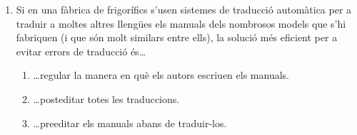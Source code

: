\begin{enumerate}
\item   Si en una fàbrica de frigorífics s'usen sistemes de traducció
  automàtica per a traduir a moltes altres llengües els manuals dels
  nombrosos models que s'hi fabriquen (i que són molt similars entre
  ells), la solució més eficient per a evitar errors de traducció
  és{\ldots}
  \begin{enumerate}
  \item \ldots regular la manera en què els autors escriuen els
    manuals.
  \item \ldots posteditar totes les traduccions.
  \item \ldots preeditar els manuals abans de traduir-los.
  \end{enumerate}




\end{enumerate}

